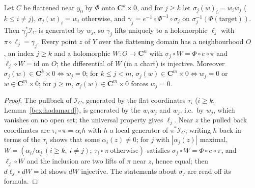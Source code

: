 \begin{lemma}
\label{bcalc:monomial-lift}
\leanok
Let \(C\) be flattened near \(y_0\) by \(\Phi\) onto \(\mathbf C^{k}\times0\), and for \(j\ge k\) let \(\sigma_j(w)_i=w_iw_j\) (\(k\le i\ne j\)),
\(\sigma_j(w)_i=w_i\) otherwise, and \(\gamma_j=e^{-1}\circ\Phi^{-1}\circ\sigma_j\) on \(\sigma_j^{-1}(\Phi(\text{target}))\). Then
\(\gamma_j^*\mathcal I_C\) is generated by \(w_j\), so \(\gamma_j\) lifts uniquely to a holomorphic \(\ell_j\) with \(\pi\circ\ell_j=\gamma_j\).
Every point \(z\) of \(Y\) over the flattening domain has a neighbourhood \(O\), an index \(j\ge k\) and a holomorphic
\(W\colon O\to\mathbf C^n\) with \(\sigma_j\circ W=\Phi\circ e\circ\pi\) and \(\ell_j\circ W=\mathrm{id}\) on \(O\); the differential of \(W\)
(in a chart) is injective. Moreover \(\sigma_j(w)\in\mathbf C^{k}\times0\iff w_j=0\); for \(k\le j<m\),
\(\sigma_j(w)\in\mathbf C^{m}\times0\iff w_j=0\) or \(w\in\mathbf C^{m}\times0\); for \(j\ge m\), \(\sigma_j(w)\in\mathbf C^m\times0\) forces \(w_j=0\).
\end{lemma}
\begin{proof}
\leanok
The pullback of \(\mathcal I_C\), generated by the flat coordinates \(\tau_i\) (\(i\ge k\), Lemma~\ref{bex:hadamard}), is generated by the
\(w_iw_j\) and \(w_j\), i.e.\ by \(w_j\), which vanishes on no open set; the universal property gives \(\ell_j\). Near \(z\) the pulled back
coordinates are \(\tau_i\circ\pi=\alpha_ih\) with \(h\) a local generator of \(\pi^*\mathcal I_C\); writing \(h\) back in terms of the
\(\tau_i\) shows that some \(\alpha_i(z)\ne0\); for \(j\) with \(|\alpha_j(z)|\) maximal, \(W=(\alpha_i/\alpha_j\ (i\ge k,\ i\ne j);\ \tau_i\circ\pi
\ \text{otherwise})\) satisfies \(\sigma_j\circ W=\Phi\circ e\circ\pi\), and \(\ell_j\circ W\) and the inclusion are two lifts of \(\pi\) near
\(z\), hence equal; then \(d\ell_j\circ dW=\mathrm{id}\) shows \(dW\) injective. The statements about \(\sigma_j\) are read off its formula.
\end{proof}

